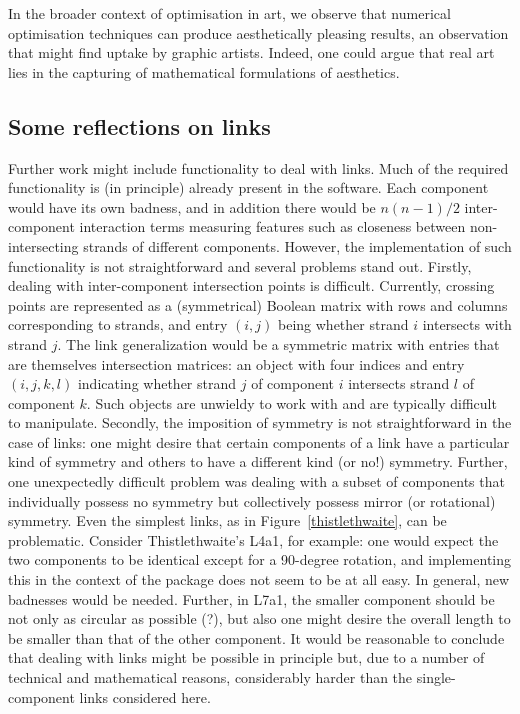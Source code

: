 \documentclass{birkjour}
\theoremstyle{definition}
\theoremstyle{remark}
\numberwithin{equation}{section}
\begin{document}
In the broader context of optimisation in art, we observe that
numerical optimisation techniques can produce aesthetically pleasing
results, an observation that might find uptake by graphic artists.
Indeed, one could argue that real art lies in the capturing of
mathematical formulations of aesthetics.

\subsection{Some reflections on links}

Further work might include functionality to deal with links.  Much of
the required functionality is (in principle) already present in the
software.  Each component would have its own badness, and in addition
there would be $n(n-1)/2$ inter-component interaction terms measuring
features such as closeness between non-intersecting strands of
different components.  However, the implementation of such
functionality is not straightforward and several problems stand out.
Firstly, dealing with inter-component intersection points is
difficult.  Currently, crossing points are represented as a
(symmetrical) Boolean matrix with rows and columns corresponding to
strands, and entry $(i,j)$ being whether strand $i$ intersects with
strand $j$.  The link generalization would be a symmetric matrix with
entries that are themselves intersection matrices: an object with four
indices and entry $(i,j,k,l)$ indicating whether strand $j$ of
component $i$ intersects strand $l$ of component $k$.  Such objects
are unwieldy to work with and are typically difficult to manipulate.
Secondly, the imposition of symmetry is not straightforward in the
case of links: one might desire that certain components of a link have
a particular kind of symmetry and others to have a different kind (or
no!) symmetry.  Further, one unexpectedly difficult problem was
dealing with a subset of components that individually possess no
symmetry but collectively possess mirror (or rotational) symmetry.
Even the simplest links, as in Figure~\ref{thistlethwaite}, can be
problematic.  Consider Thistlethwaite's L4a1, for example: one would
expect the two components to be identical except for a 90-degree
rotation, and implementing this in the context of the package does not
seem to be at all easy.  In general, new badnesses would be needed.
Further, in L7a1, the smaller component should be not only as circular
as possible (?), but also one might desire the overall length to be
smaller than that of the other component.  It would be reasonable to
conclude that dealing with links might be possible in principle but,
due to a number of technical and mathematical reasons, considerably
harder than the single-component links considered here.
\end{document}
